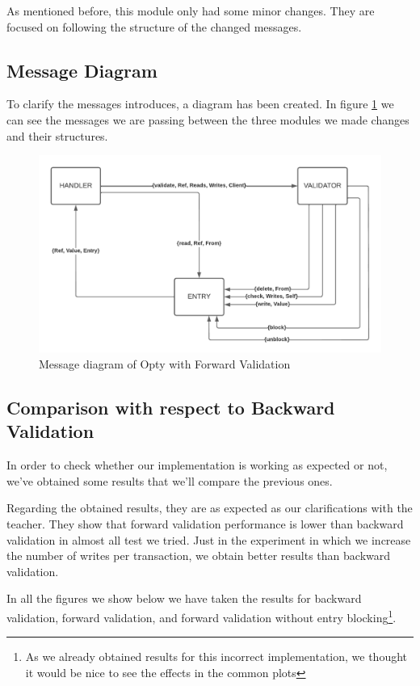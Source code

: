\documentclass[a4paper, 10pt]{article}
\begin{document}
As mentioned before, this module only had some minor changes. They are focused on following the structure of the changed messages.

\clearpage

\subsection{Message Diagram}

To clarify the messages introduces, a diagram has been created. In figure \ref{fig:diagram} we can see the messages we are passing between the three modules we made changes and their structures.

\begin{figure}[H]
  \centering
  \includegraphics[width=0.95\linewidth]{images/messagesForward.pdf}
    \caption{Message diagram of Opty with Forward Validation}
    \label{fig:diagram}
\end{figure} 

\clearpage

\subsection{Comparison with respect to Backward Validation}
In order to check whether our implementation is working as expected or not, we've obtained some results that we'll compare the previous ones. 

Regarding the obtained results, they are as expected as our clarifications with the teacher. They show that forward validation performance is lower than backward validation in almost all test we tried. Just in the experiment in which we increase the number of writes per transaction, we obtain better results than backward validation.

In all the figures we show below we have taken the results for backward validation, forward validation, and forward validation without entry blocking\footnote{As we already obtained results for this incorrect implementation, we thought it would be nice to see the effects in the common plots}.
\end{document}
